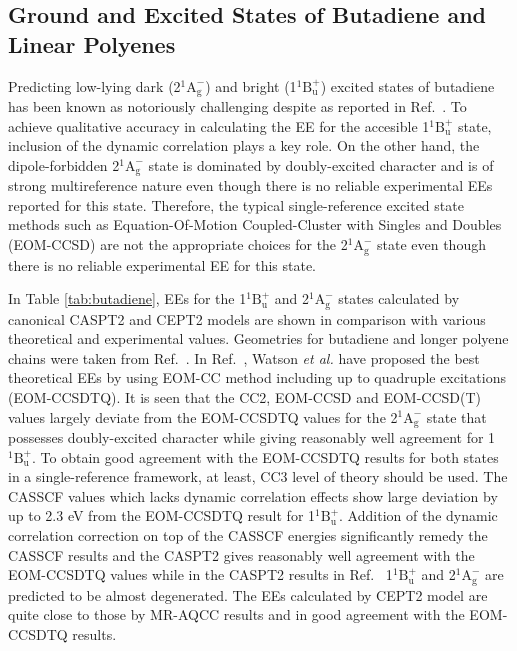 \documentclass[aip,jcp,amsmath,twocolumn,floatfix,reprint,fleqn]{revtex4-1}
\begin{document}
\subsection{Ground and Excited States of Butadiene and Linear Polyenes}

%
Predicting low-lying dark (2${}^1\text{A}_\text{g}^{-}$) and bright (1${}^1\text{B}_\text{u}^{+}$) excited states of butadiene has been known as notoriously challenging despite as reported in Ref.~.
%
To achieve qualitative accuracy in calculating the EE for the accesible 1${}^1\text{B}_\text{u}^{+}$ state, inclusion of the dynamic correlation plays a key role.
%
On the other hand, the dipole-forbidden 2${}^1\text{A}_\text{g}^{-}$ state is dominated by doubly-excited character and is of strong multireference nature even though there is no reliable experimental EEs reported for this state.
%
Therefore, the typical single-reference excited state methods such as Equation-Of-Motion Coupled-Cluster with Singles and Doubles (EOM-CCSD) are not the appropriate choices for the 2${}^1\text{A}_\text{g}^{-}$ state even though there is no reliable experimental EE for this state.

%
In Table \ref{tab:butadiene}, EEs for the 1${}^1\text{B}_\text{u}^{+}$ and 2${}^1\text{A}_\text{g}^{-}$ states calculated by canonical CASPT2 and CEPT2 models are shown in comparison with various theoretical and experimental values.
%
Geometries for butadiene and longer polyene chains were taken from Ref.~.
%
In Ref.~, Watson {\it et al.} have proposed the best theoretical EEs by using EOM-CC method including up to quadruple excitations (EOM-CCSDTQ).
%
It is seen that the CC2, EOM-CCSD and EOM-CCSD(T) values largely deviate from the EOM-CCSDTQ values for the 2${}^1\text{A}_\text{g}^{-}$ state that possesses doubly-excited character while giving reasonably well agreement for 1${}^1\text{B}_\text{u}^{+}$.
%
To obtain good agreement with the EOM-CCSDTQ results for both states in a single-reference framework, at least, CC3 level of theory should be used.
%
The CASSCF values which lacks dynamic correlation effects show large deviation by up to 2.3 eV from the EOM-CCSDTQ result for 1${}^1\text{B}_\text{u}^{+}$.
%
Addition of the dynamic correlation correction on top of the CASSCF energies significantly remedy the CASSCF results and the CASPT2 gives reasonably well agreement with the EOM-CCSDTQ values while in the CASPT2 results in Ref.~ 1${}^1\text{B}_\text{u}^{+}$ and 2${}^1\text{A}_\text{g}^{-}$ are predicted to be almost degenerated.
%
The EEs calculated by CEPT2 model are quite close to those by MR-AQCC results and in good agreement with the EOM-CCSDTQ results.
\end{document}
